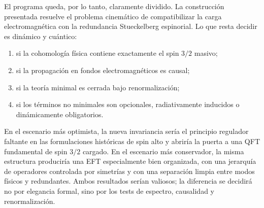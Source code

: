 \documentclass[11pt,a4paper]{article}
\numberwithin{equation}{section}
\begin{document}
El programa queda, por lo tanto, claramente dividido. La construcción presentada
resuelve el problema cinemático de compatibilizar la carga electromagnética con la
redundancia Stueckelberg espinorial. Lo que resta decidir es dinámico y cuántico:
\begin{enumerate}[label=(\roman*)]
\item si la cohomología física contiene exactamente el spin $3/2$ masivo;
\item si la propagación en fondos electromagnéticos es causal;
\item si la teoría minimal es cerrada bajo renormalización;
\item si los términos no minimales son opcionales, radiativamente inducidos o
      dinámicamente obligatorios.
\end{enumerate}

En el escenario más optimista, la nueva invariancia sería el principio regulador faltante
en las formulaciones históricas de spin alto y abriría la puerta a una QFT fundamental
de spin $3/2$ cargado. En el escenario más conservador, la misma estructura produciría
una EFT especialmente bien organizada, con una jerarquía de operadores controlada por
simetrías y con una separación limpia entre modos físicos y redundantes. Ambos resultados
serían valiosos; la diferencia se decidirá no por elegancia formal, sino por los tests de
espectro, causalidad y renormalización.
\end{document}
